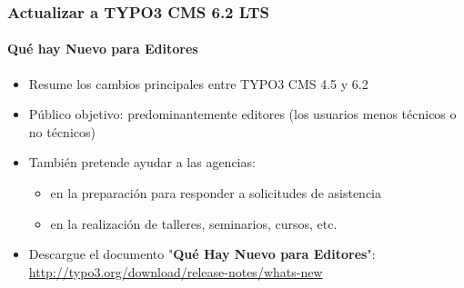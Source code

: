 \begin{frame}[fragile]
	\frametitle{Actualizar a TYPO3 CMS 6.2 LTS}
	\framesubtitle{Qué hay Nuevo para Editores}

	\begin{itemize}
		\item Resume los cambios principales entre TYPO3 CMS 4.5 y 6.2
		\item Público objetivo: predominantemente editores (los usuarios menos técnicos o no técnicos)
		\item También pretende ayudar a las agencias:

			\begin{itemize}
				\item en la preparación para responder a solicitudes de asistencia
				\item en la realización de talleres, seminarios, cursos, etc.
			\end{itemize}

		\item Descargue el documento "\textbf{Qué Hay Nuevo para Editores}":\newline
			\smaller\url{http://typo3.org/download/release-notes/whats-new}\normalsize
	\end{itemize}

\end{frame}



